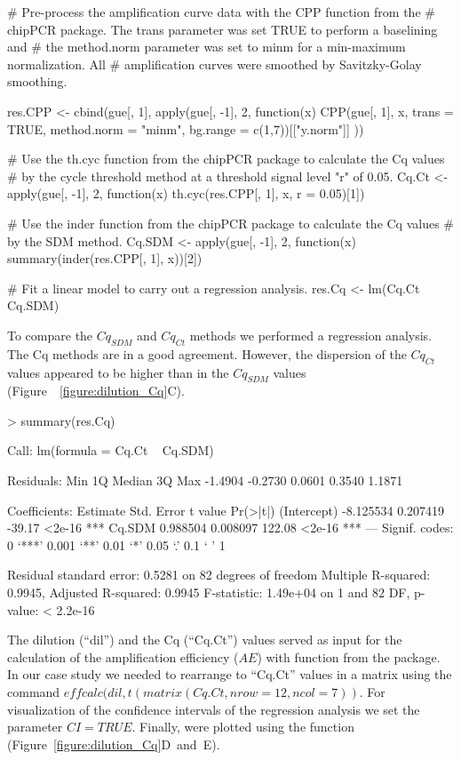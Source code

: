 \begin{example}
# Pre-process the amplification curve data with the CPP function from the 
# chipPCR package. The trans parameter was set TRUE to perform a baselining and 
# the method.norm parameter was set to minm for a min-maximum normalization. All
# amplification curves were smoothed by Savitzky-Golay smoothing.

res.CPP <- cbind(gue[, 1], apply(gue[, -1], 2, function(x) {
  CPP(gue[, 1], x, trans = TRUE, method.norm = "minm", 
      bg.range = c(1,7))[["y.norm"]]
}))

# Use the th.cyc function from the chipPCR package to calculate the Cq values
# by the cycle threshold method at a threshold signal level "r" of 0.05.
Cq.Ct <- apply(gue[, -1], 2, function(x) 
  th.cyc(res.CPP[, 1], x, r = 0.05)[1])

# Use the inder function from the chipPCR package to calculate the Cq values
# by the SDM method.
Cq.SDM <- apply(gue[, -1], 2, function(x)
  summary(inder(res.CPP[, 1], x))[2])

# Fit a linear model to carry out a regression analysis.
res.Cq <- lm(Cq.Ct ~ Cq.SDM)
\end{example}

To compare the $Cq_{SDM}$ and $Cq_{Ct}$ methods we performed a regression 
analysis. The Cq methods are in a good agreement. However, the dispersion of the 
$Cq_{Ct}$ values appeared to be higher than in the $Cq_{SDM}$ values 
(Figure~~\ref{figure:dilution_Cq}C).

\begin{example}
> summary(res.Cq)

Call:
lm(formula = Cq.Ct ~ Cq.SDM)

Residuals:
    Min      1Q  Median      3Q     Max 
-1.4904 -0.2730  0.0601  0.3540  1.1871 

Coefficients:
             Estimate Std. Error t value Pr(>|t|)    
(Intercept) -8.125534   0.207419  -39.17   <2e-16 ***
Cq.SDM       0.988504   0.008097  122.08   <2e-16 ***
---
Signif. codes:  0 ‘***’ 0.001 ‘**’ 0.01 ‘*’ 0.05 ‘.’ 0.1 ‘ ’ 1

Residual standard error: 0.5281 on 82 degrees of freedom
Multiple R-squared:  0.9945,	Adjusted R-squared:  0.9945 
F-statistic: 1.49e+04 on 1 and 82 DF,  p-value: < 2.2e-16
\end{example}

The dilution (``dil'') and the Cq (``Cq.Ct'') values served as input for the 
calculation of the amplification efficiency ($AE$) with  function 
from the  package. In our case study we needed to rearrange to 
``Cq.Ct'' values in a matrix using the command $effcalc(dil, t(matrix(Cq.Ct, 
nrow = 12, ncol = 7))$. For visualization of the confidence intervals of the 
regression analysis we set the parameter $CI = TRUE$. Finally, were plotted 
using the  function (Figure~\ref{figure:dilution_Cq}D~and~E).

